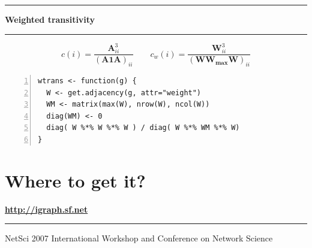 \documentclass[a0]{sciposter}
\begin{document}
\begin{multicols}{3}
\vspace{20pt}\hrule\vspace{20pt}
\centerline{\bf Weighted transitivity}
\vspace{20pt}\hrule\vspace{20pt}

\[ 
  c(i)=\frac{\mathbf{A}^3_{ii}}{(\mathbf{A1A})_{ii}} \qquad
  c_w(i)=\frac{\mathbf{W}^3_{ii}}{(\mathbf{WW_{\text{max}}W})_{ii}}
\]

\begin{Verbatim}[fontsize=\small,numbers=left]
wtrans <- function(g) {
  W <- get.adjacency(g, attr="weight")
  WM <- matrix(max(W), nrow(W), ncol(W))
  diag(WM) <- 0
  diag( W %*% W %*% W ) / diag( W %*% WM %*% W)
}
\end{Verbatim}

\section{Where to get it?}
\centerline{\bf\LARGE \url{http://igraph.sf.net}}

\end{multicols}

\enlargethispage{2cm}
\vfill
\hrule
\vfill
\centerline{\small NetSci 2007 International Workshop and Conference
  on Network Science}
\vfill
\end{document}
